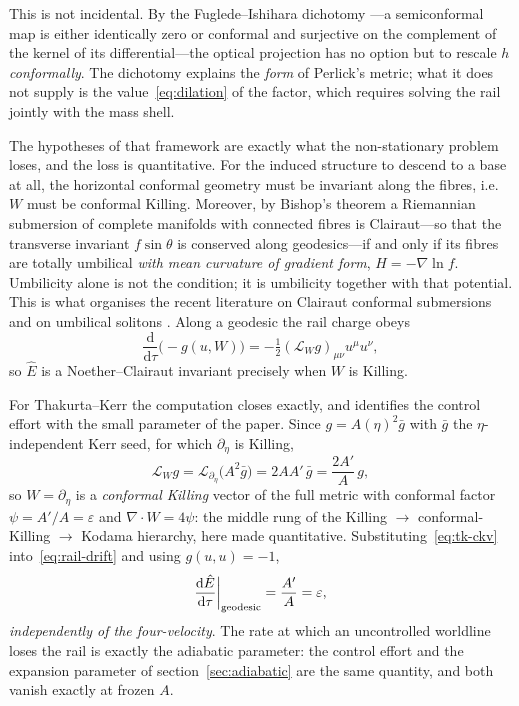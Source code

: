 \documentclass[12pt]{iopart}
\theoremstyle{plain}
\theoremstyle{definition}
\theoremstyle{remark}
\newcommand{\Ehat}{\hat E}
\newcommand{\dd}{\mathrm{d}}
\begin{document}
This is not incidental. By the Fuglede--Ishihara dichotomy
\cite{Fuglede1978,Ishihara1979,BairdWood2003}---a semiconformal map is either
identically zero or conformal and surjective on the complement of the kernel of
its differential---the optical projection has no option but to rescale $h$
\emph{conformally}. The dichotomy explains the \emph{form} of Perlick's metric;
what it does not supply is the value~\eqref{eq:dilation} of the factor, which
requires solving the rail jointly with the mass shell.

The hypotheses of that framework are exactly what the non-stationary problem
loses, and the loss is quantitative. For the induced structure to descend to a
base at all, the horizontal conformal geometry must be invariant along the
fibres, i.e.\ $W$ must be conformal Killing. Moreover, by Bishop's theorem
\cite{Bishop1972} a Riemannian submersion of complete manifolds with connected
fibres is Clairaut---so that the transverse invariant $f\sin\theta$ is conserved
along geodesics---if and only if its fibres are totally umbilical \emph{with mean
curvature of gradient form}, $H=-\nabla\ln f$. Umbilicity alone is not the
condition; it is umbilicity together with that potential. This is what organises
the recent literature on Clairaut conformal submersions and on umbilical solitons
\cite{MeenaZawadzki2024,Lecian2026Yamabe,Lecian2026Solitons}.
Along a geodesic the rail charge obeys
\begin{equation}
    \frac{\dd}{\dd\tau}\big(\!-\!g(u,W)\big)
      =-\tfrac12(\mathcal L_Wg)_{\mu\nu}u^\mu u^\nu ,
    \label{eq:rail-drift}
\end{equation}
so $\Ehat$ is a Noether--Clairaut invariant precisely when $W$ is Killing.

For Thakurta--Kerr the computation closes exactly, and identifies the control
effort with the small parameter of the paper. Since $g=A(\eta)^2\bar g$ with
$\bar g$ the $\eta$-independent Kerr seed, for which $\partial_\eta$ is Killing,
\begin{equation}
    \mathcal L_Wg=\mathcal L_{\partial_\eta}\!\big(A^2\bar g\big)
      =2AA'\,\bar g=\frac{2A'}{A}\,g ,
    \label{eq:tk-ckv}
\end{equation}
so $W=\partial_\eta$ is a \emph{conformal Killing} vector of the full metric
with conformal factor $\psi=A'/A=\varepsilon$ and $\nabla\!\cdot\!W=4\psi$: the
middle rung of the Killing $\to$ conformal-Killing $\to$ Kodama hierarchy, here
made quantitative. Substituting~\eqref{eq:tk-ckv} into~\eqref{eq:rail-drift} and
using $g(u,u)=-1$,
\begin{equation}
    \frac{\dd\Ehat}{\dd\tau}\bigg|_{\rm geodesic}=\frac{A'}{A}=\varepsilon ,
    \label{eq:tk-drift}
\end{equation}
\emph{independently of the four-velocity}. The rate at which an uncontrolled
worldline loses the rail is exactly the adiabatic parameter: the control effort
and the expansion parameter of section~\ref{sec:adiabatic} are the same
quantity, and both vanish exactly at frozen $A$.
\end{document}
